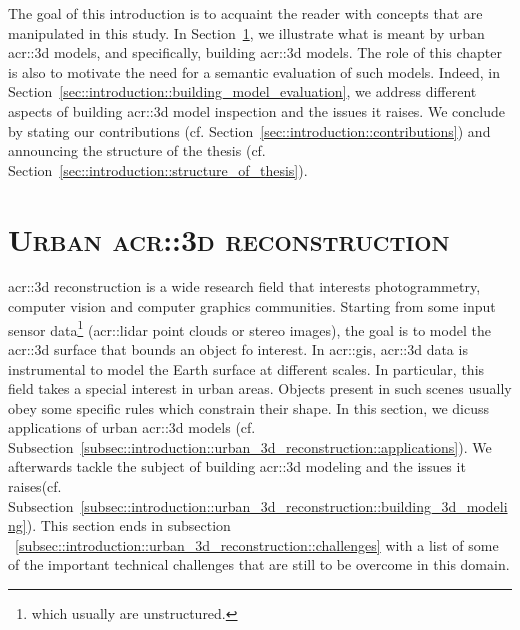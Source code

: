 \minitoc

\vfill

The goal of this introduction is to acquaint the reader with concepts that are manipulated in this study.
In Section~\ref{sec::introduction::urban_3d_reconstruction}, we illustrate what is meant by urban \gls{acr::3d} models, and specifically,  building \gls{acr::3d} models.
The role of this chapter is also to motivate the need for a semantic evaluation of such models.
Indeed, in Section~\ref{sec::introduction::building_model_evaluation}, we address different aspects of building \gls{acr::3d} model inspection and the issues it raises.
We conclude by stating our contributions (cf. Section~\ref{sec::introduction::contributions}) and announcing the structure of the thesis (cf. Section~\ref{sec::introduction::structure_of_thesis}).

\clearpage

\section{\textsc{Urban \texorpdfstring{\acrshort*{acr::3d}}{3D} reconstruction}}
    \label{sec::introduction::urban_3d_reconstruction}
    \gls{acr::3d} reconstruction is a wide research field that interests photogrammetry, computer vision and computer graphics communities.
    Starting from some input sensor data\footnote{which usually are unstructured.} (\gls{acr::lidar} point clouds or stereo images), the goal is to model the \gls{acr::3d} surface that bounds an object fo interest.
    In \acrfull{acr::gis}, \gls{acr::3d} data is instrumental to model the Earth surface at different scales.
    In particular, this field takes a special interest in urban areas.
    Objects present in such scenes usually obey some specific rules which constrain their shape.
    In this section, we dicuss applications of urban \gls{acr::3d} models (cf. Subsection~\ref{subsec::introduction::urban_3d_reconstruction::applications}).
    We afterwards tackle the subject of  building \gls{acr::3d} modeling and the issues it raises(cf. Subsection~\ref{subsec::introduction::urban_3d_reconstruction::building_3d_modeling}).
    This section ends in subsection ~\ref{subsec::introduction::urban_3d_reconstruction::challenges} with a list of some of the important technical challenges that are still to be overcome in this domain.

